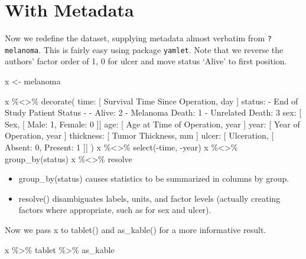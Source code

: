 \documentclass[
]{article}
\newenvironment{Shaded}{\begin{snugshade}}{\end{snugshade}}
\newcommand{\FunctionTok}[1]{\textcolor[rgb]{0.00,0.00,0.00}{#1}}
\newcommand{\NormalTok}[1]{#1}
\newcommand{\OtherTok}[1]{\textcolor[rgb]{0.56,0.35,0.01}{#1}}
\newcommand{\SpecialCharTok}[1]{\textcolor[rgb]{0.00,0.00,0.00}{#1}}
\newcommand{\StringTok}[1]{\textcolor[rgb]{0.31,0.60,0.02}{#1}}
\begin{document}
\hypertarget{with-metadata}{%
\section{With Metadata}\label{with-metadata}}

Now we redefine the dataset, supplying metadata almost verbatim from
\texttt{?melanoma}. This is fairly easy using package \texttt{yamlet}.
Note that we reverse the authors' factor order of 1, 0 for ulcer and
move status `Alive' to first position.

\begin{Shaded}
\begin{Highlighting}[]
\NormalTok{x }\OtherTok{\textless{}{-}}\NormalTok{ melanoma}

\NormalTok{x }\SpecialCharTok{\%\textless{}\textgreater{}\%} \FunctionTok{decorate}\NormalTok{(}\StringTok{\textquotesingle{}}
\StringTok{time:      [ Survival Time Since Operation, day ]}
\StringTok{status:}
\StringTok{ {-} End of Study Patient Status}
\StringTok{ {-}}
\StringTok{  {-} Alive: 2}
\StringTok{  {-} Melanoma Death: 1}
\StringTok{  {-} Unrelated Death: 3}
\StringTok{sex:       [ Sex, [ Male: 1, Female: 0 ]]}
\StringTok{age:       [ Age at Time of Operation, year ]}
\StringTok{year:      [ Year of Operation, year ]}
\StringTok{thickness: [ Tumor Thickness, mm ]}
\StringTok{ulcer:     [ Ulceration, [ Absent: 0, Present: 1 ]]}
\StringTok{\textquotesingle{}}\NormalTok{)}
\NormalTok{x }\SpecialCharTok{\%\textless{}\textgreater{}\%} \FunctionTok{select}\NormalTok{(}\SpecialCharTok{{-}}\NormalTok{time, }\SpecialCharTok{{-}}\NormalTok{year)}
\NormalTok{x }\SpecialCharTok{\%\textless{}\textgreater{}\%} \FunctionTok{group\_by}\NormalTok{(status)}
\NormalTok{x }\SpecialCharTok{\%\textless{}\textgreater{}\%}\NormalTok{ resolve}
\end{Highlighting}
\end{Shaded}

\begin{itemize}
\item
  group\_by(status) causes statistics to be summarized in columns by
  group.
\item
  resolve() disambiguates labels, units, and factor levels (actually
  creating factors where appropriate, such as for sex and ulcer).
\end{itemize}

Now we pass x to tablet() and as\_kable() for a more informative result.

\begin{Shaded}
\begin{Highlighting}[]
\NormalTok{x }\SpecialCharTok{\%\textgreater{}\%}\NormalTok{ tablet }\SpecialCharTok{\%\textgreater{}\%}\NormalTok{ as\_kable}
\end{Highlighting}
\end{Shaded}
\end{document}
